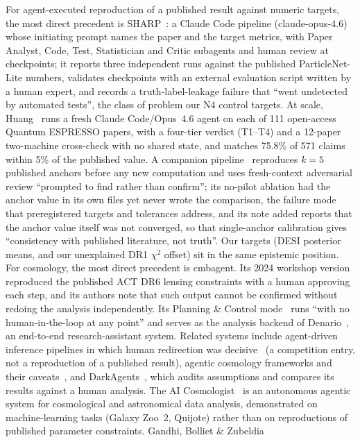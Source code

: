 \documentclass[11pt]{article}
\begin{document}
For agent-executed reproduction of a published result against numeric targets, the most direct precedent is SHARP~\cite{sharp2026}: a Claude Code
pipeline (claude-opus-4.6) whose initiating prompt names the paper and the target metrics, with Paper Analyst, Code, Test, Statistician and Critic subagents and human
review at checkpoints; it reports three independent runs against the published ParticleNet-Lite numbers, validates checkpoints with an external evaluation script written by
a human expert, and records a truth-label-leakage failure that ``went undetected by automated tests'', the class of problem our N4 control targets. At scale,
Huang~\cite{huang2026scrutiny} runs a fresh Claude Code/Opus~4.6 agent on each of 111 open-access Quantum ESPRESSO papers, with a four-tier verdict (T1--T4) and a 12-paper
two-machine cross-check with no shared state, and matches 75.8\% of 571 claims within 5\% of the published value. A companion pipeline~\cite{huang2026grounded} reproduces
$k=5$ published anchors before any new computation and uses fresh-context adversarial review ``prompted to find rather than confirm''; its no-pilot ablation had the anchor
value in its own files yet never wrote the comparison, the failure mode that preregistered targets and tolerances address, and its note added reports that the anchor value itself
was not converged, so that single-anchor calibration gives ``consistency with published literature, not truth''. Our targets (DESI posterior means, and our unexplained DR1
$\chi^2$ offset) sit in the same epistemic position. For cosmology, the most direct precedent is cmbagent. Its 2024 workshop version~\cite{laverick2024} reproduced the published ACT DR6 lensing constraints with a human
approving each step, and its authors note that such output cannot be confirmed without redoing the analysis independently. Its Planning \& Control
mode~\cite{xu2025pc} runs ``with no human-in-the-loop at any point'' and serves as the analysis backend of Denario~\cite{denario2025}, an end-to-end
research-assistant system. Related systems
include agent-driven inference pipelines in which human redirection was decisive~\cite{borrett2026} (a competition entry, not a reproduction of a
published result), agentic cosmology frameworks and their caveats~\cite{xu2026}, and DarkAgents~\cite{darkagents2026}, which audits assumptions and
compares its results against a human analysis. The AI Cosmologist~\cite{moss2025} is an autonomous agentic system for cosmological and astronomical data analysis,
demonstrated on machine-learning tasks (Galaxy Zoo~2, Quijote) rather than on reproductions of published parameter constraints. Gandhi, Bolliet \& Zubeldia~\cite{gandhi2025}
\end{document}
